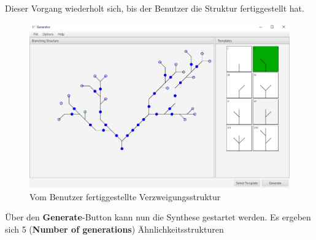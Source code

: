Dieser Vorgang wiederholt sich, bis der Benutzer die Struktur fertiggestellt hat.
\begin{figure}[H]
    \centering
    \includegraphics[width=13cm]{../images/UI_finished.png}
    \caption{Vom Benutzer fertiggestellte Verzweigungsstruktur}
\end{figure}

Über den \textbf{Generate}-Button kann nun die Synthese gestartet werden.
Es ergeben sich 5 (\textbf{Number of generations}) Ähnlichkeitsstrukturen

